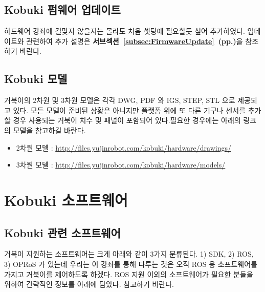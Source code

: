 \subsection{Kobuki 펌웨어 업데이트}

하드웨어 강좌에 걸맞지 않을지는 몰라도 처음 셋팅에 필요할듯 싶어 추가하였다. 업데이트와 관련하여 추가 설명은 \textbf{서브섹션~\ref{subsec:FirmwareUpdate}~(pp.\pageref{subsec:FirmwareUpdate})}을 참조하기 바란다.

\subsection{Kobuki 모델}

거북이의 2차원 및 3차원 모델은 각각 DWG, PDF 와 IGS, STEP, STL 으로 제공되고 있다. 모든 모델이 준비된 상황은 아니지만 플랫폼 위에 또 다른 기구나 센서를 추가할 경우 사용되는 거북이 치수 및 패널이 포함되어 있다.필요한 경우에는 아래의 링크의 모델을 참고하길 바란다.

\begin{itemize}[leftmargin=*]
\item 2차원 모델 : \url{http://files.yujinrobot.com/kobuki/hardware/drawings/}
\item 3차원 모델 : \url{http://files.yujinrobot.com/kobuki/hardware/models/}
\end{itemize}

\section{Kobuki 소프트웨어}

\subsection{Kobuki 관련 소프트웨어}

거북이 지원하는 소프트웨어는 크게 아래와 같이 3가지 분류된다. 1) SDK, 2) ROS, 3) OPRoS 가 있는데 우리는 이 강좌를 통해 다루는 것은 오직 ROS 용 소프트웨어를 가지고 거북이를 제어하도록 하겠다. ROS 지원 이외의 소프트웨어가 필요한 분들을 위하여 간략적인 정보를 아래에 담았다. 참고하기 바란다.

